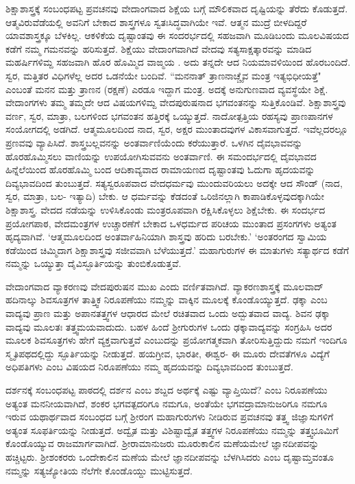 ಶಿಕ್ಷಾಶಾಸ್ತ್ರಕ್ಕೆ  ಸಂಬಂಧಪಟ್ಟ ಪ್ರವಚನವು ವೇದಾಂಗವಾದ ಶಿಕ್ಷೆಯ ಬಗ್ಗೆ ಮೌಲಿಕವಾದ ದೃಷ್ಟಿಯನ್ನು ತೆರೆದು ಕೊಡುತ್ತದೆ. ಆತ್ಮವಿರುವೆಡೆಯಲ್ಲಿ ಅವನಿಗೆ ಬೇಕಾದ ಶಾಸ್ತ್ರಗಳೂ ಸ್ವತಃಸಿದ್ಧವಾಗಿಯೇ ಇವೆ. ಆತ್ಮನ ಮುದ್ರೆ ಬೀಳದಿದ್ದರೆ ಯಾವಶಾಸ್ತ್ರಕ್ಕೂ ಬೆಳಕಿಲ್ಲ. ಆಕಳಿಕೆಯ ದೃಷ್ಟಾಂತವು ಈ ಸಂದರರ್ಭದಲ್ಲಿ ಸಹಜವಾಗಿ ಮೂಡಿಬಂದು ಮೂಲವಿಷಯದ ಕಡೆಗೆ ನಮ್ಮ ಗಮನವನ್ನು ಹರಿಸುತ್ತದೆ. ಶಿಕ್ಷೆಯು ವೇದಾಂಗವಾಗಿದೆ ವೇದವು ಸತ್ಯಸಾಕ್ಷತ್ಕಾರವನ್ನು ಮಾಡಿದ ಮಹರ್ಷಿಗಳಿಮ್ದ ಸಹಜವಾಗಿ ಹೊರ ಹೊಮ್ಮಿದ ವಾಙ್ಮಯ . ಅದು ತನ್ನದೇ ಆದ ನಿಯಮಾವಳಿಯಿಂದ ಹೊರಬಂದಿದೆ. ಸ್ವರ, ಮತ್ತಿತರ ವಿಧಿಗಳೆಲ್ಲ ಅದರ ಒಡನೆಯೇ ಬಂದಿವೆ. ``ಮನನಾತ್ ತ್ರಾಣನಾಚ್ಚೈವ ಮಂತ್ರ ಇತ್ಯಭಿಧೀಯತ್ತೆ" ಎಂಬಂತೆ ಮನನ ಮತ್ತು ತ್ರಾಣನ (ರಕ್ಷಣೆ) ಎರಡೂ ಇದ್ದಾಗ ಮಂತ್ರ. ಅದಕ್ಕೆ ಅನುಗುಣವಾದ ವ್ಯವಸ್ಥೆಯೇ ಶಿಕ್ಷೆ. ವೇದಾಂಗಗಳು ತಮ್ಮ  ತಮ್ಮದೇ ಆದ ವಿಷಯಗಳಿಮ್ದ ವೇದಪುರುಷನಾದ ಭಗವಂತನನ್ನು ಸುತ್ತಿಕೊಂಡಿವೆ. ಶಿಕ್ಷಾಶಾಸ್ತ್ರವು ವರ್ಣ, ಸ್ವರ, ಮಾತ್ರಾ, ಬಲಗಳಿಂದ ಭಗವಂತನ ಹತ್ತಿರಕ್ಕೆ ಒಯ್ಯುತ್ತದೆ. ನಾದೋತ್ಪತ್ತಿಯ ರಹಸ್ಯವು ಪ್ರಾಣಪಾನಗಳ ಸಂಯೋಗದಲ್ಲಿ ಅಡಗಿದೆ. ಆತ್ಮಮೂಲದಿಂದ ನಾದ, ಸ್ವರ, ಅಕ್ಷರ ಮುಂತಾದವುಗಳ ವಿಕಾಸವಾಗುತ್ತದೆ. ಇವೆಲ್ಲದರಲ್ಲೂ ಪ್ರಣವವು ವ್ಯಾಪಿಸಿದೆ. ಶಾಸ್ತ್ರಬಲ್ಲವನನ್ನು ಅಂತರ್ವಾಣಿಯೆಂದು ಕರೆಯುತ್ತಾರೆ. ಒಳಗಿನ ದೈವಭಾವವನ್ನು ಹೊರಹೊಮ್ಮಿಸಲು ವಾಣಿಯನ್ನು ಉಪಯೋಗಿಸುವವನು ಅಂತರ್ವಾಣಿ. ಈ ಸಮಂದರ್ಭದಲ್ಲಿ ದೈವಭಾವದ ಹಿನ್ನೆಲೆಯಿಂದ ಹೊರಹೊಮ್ಮಿ ಬಂದ ಆದಿಕಾವ್ಯವಾದ ರಾಮಾಯಣದ ದೃಷ್ಟಾಂತವು ಓದುಗಾ ಹೃದಯವನ್ನು ದಿವ್ಯಭಾವದಿಂದ ತುಂಬುತ್ತದೆ. ಸತ್ಯಸ್ವರೂಪವಾದ ವೇದಧರ್ಮವು ಮುಂದುವರಿಯಲು ಅದಕ್ಕೇ ಆದ ಸೌಂಡ್ (ನಾದ, ಸ್ವರ, ಮಾತ್ರಾ, ಬಲ- ಇತ್ಯಾದಿ) ಬೇಕು. ಆ ಧರ್ಮವನ್ನು ಕೆಡದಂತೆ ಒರಿಜಿನಲ್ಲಾಗಿ ಕಾಪಾಡಿಕೊಳ್ಳವುದಕ್ಕಾಗಿಯೇ ಶಿಕ್ಷಾಶಾಸ್ತ್ರ. ವೇದದ ನಡೆಯನ್ನು ಉಳಿಸಿಕೊಂಡು ಮಂತ್ರರೂಪವಾಗಿ ರಕ್ಷಿಸಿಕೊಳ್ಳಲು ಶಿಕ್ಷೆಬೇಕು. ಈ ಸಂದರ್ಭದ ಪ್ರಯೋಗಪಾಠ, ವೇದಮಂತ್ರಗಳ ಉಚ್ಚಾರಣೆಗೆ ಬೇಕಾದ ಒಳಧರ್ಮದ ಪರಿಚಯ ಮುಂತಾದ ಪ್ರಸಂಗಗಳು ಅತ್ಯಂತ ಹೃದ್ಯವಾಗಿವೆ. `ಆತ್ಮಮೂಲದಿಂದ ಅಂತರ್ವಾಹಿನಿಯಾಗಿ ಶಾಸ್ತ್ರವು ಹರಿದು ಬರಬೇಕು.' `ಅಂತರಂಗದ ಸ್ವಾಮಿಯ ಕಡೆಯಿಂದ ಚಿಮ್ಮಿದಾಗ ಶಿಕ್ಷಾಶಾಸ್ತ್ರವು ಸಜೀವವಾಗಿ ಬೆಳೆಯುತ್ತದೆ.' ಮಹಾಗುರುಗಳ ಈ ಮಾತುಗಳು ಸತ್ಯಾರ್ಥದ ಕಡೆಗೆ ನಮ್ಮನ್ನು ಒಯ್ಯುತ್ತಾ ದೈವಿಸ್ಛೂರ್ತಿಯನ್ನು ತುಂಬಿಕೊಡುತ್ತವೆ.

ವೇದಾಂಗವಾದ ವ್ಯಾಕರಣವು ವೇದಪುರುಷನ ಮುಖ ಎಂದು ವರ್ಣಿತವಾಗಿದೆ. ವ್ಯಾಕರಣಶಾಸ್ತ್ರಕ್ಕೆ ಮೂಲವಾದ್ ಹದಿನಾಲ್ಕು ಶಿವಸೂತ್ರಗಳ ತಾತ್ತ್ವಿಕ ನಿರೂಪಣೆಯು ನಮ್ಮನ್ನು ವಾಕ್ಕಿನ ಮೂಲಕ್ಕೆ ಕೊಂಡೊಯ್ಯುತ್ತದೆ. ಢಕ್ಕಾ ಎಂಬ ವಾದ್ಯವು ಪ್ರಾಣ ಮತ್ತು ಅಪಾನತತ್ತ್ವಗಳ ಆಧಾರದ ಮೇಲೆ ರಚಿತವಾದ ಒಂದು ಅದ್ಬುತವಾದ ವಾದ್ಯ. ಶಿವನ ಢಕ್ಕಾ ವಾದ್ಯವು ಮೂಲತಃ ತತ್ತ್ವಮಯವಾದುದು. ಬಹಳ ಹಿಂದೆ ಶ್ರೀಗುರುಗಳ ಒಂದು ಢಕ್ಕಾವಾದ್ಯವನ್ನು ಸಂಗ್ರಹಿಸಿ ಅದರ ಮೂಲಕ ಶಿವಸೂತ್ರಗಳು ಹೇಗೆ ವ್ಯಕ್ತವಾಗುತ್ತವೆ ಎಂಬುದನ್ನು ಪ್ರಯೋಗತ್ಮಕವಾಗಿ ತೋರಿಸುತ್ತಿದ್ದುದು ನಮಗೆ  ಇಂದಿಗೂ ಸ್ಮೃತಿಪಥದಲ್ಲಿದ್ದು ಸ್ಫೂರ್ತಿಯನ್ನು ನೀಡುತ್ತದೆ. ಹಯಗ್ರೀವ, ಭಾರತೀ, ಈಶ್ವರ- ಈ ಮೂರು ದೇವತೆಗಳೂ ವಿದ್ಯೆಗೆ ಅಧಿಪತಿಗಳು ಎಂಬ ವಿಷಯದ ನಿರೂಪಣೆಯು ನಮ್ಮ ಹೃದಯವನ್ನು ದಿವ್ಯಭಾವದಿಂದ ತುಂಬುತ್ತದೆ.

ದರ್ಶನಕ್ಕೆ  ಸಂಬಂಧಪಟ್ಟ ಪಾಠದಲ್ಲಿ ದರ್ಶನ ಎಂಬ ಶಬ್ದದ ಅರ್ಥಕ್ಕೆ ಎಷ್ಟು ವ್ಯಾಪ್ತಿಯಿದೆ? ಎಂಬ ನಿರೂಪಣೆಯು ಅತ್ಯಂತ ಮನನೀಯವಾಗಿದೆ, ಶಂಕರ ಭಗವತ್ಪದರಿಗೂ ನಮಗೂ, ಅಂತೆಯೇ ಭಗವದ್ರಾಮಾನುಜರಿಗೂ ನಮಗೂ ಇರುವ ಯಥಾರ್ಥವಾದ ಸಂಬಂಧದ ಬಗ್ಗೆ ಶ್ರೀರಂಗ ಮಹಾಗುರುಗಳು ನೀಡಿರುವ ಪ್ರವಚನವು ತತ್ತ್ವ ಜಿಜ್ಞಾಸುಗಳಿಗೆ ಅತ್ಯಂತ ಸೂಫರ್ತಿಯನ್ನು ನೀಡುತ್ತದೆ. ಅದ್ವೈತ ಮತ್ತು ವಿಶಿಷ್ಟಾದ್ವೈತ ತತ್ತ್ವಗಳ ನಿರೂಪಣೆಯು ನಮ್ಮನ್ನು ತತ್ತ್ವಭೂಮಿಗೆ ಕೊಂಡೊಯ್ಯುವ ರಾಜಮಾರ್ಗವಾಗಿದೆ. ಶ್ರೀರಾಮಾನುಜರು ಮೂರುಕಾಲಿನ ಮಣೆಯಮೇಲೆ ಜ್ಞಾನದೀಪವನ್ನು ಹಚ್ಚಿಟ್ಟರು. ಶ್ರೀಶಂಕರರು ಒಂದೇಕಾಲಿನ ಮಣೆಯ ಮೇಲೆ ಜ್ಞಾನದೀಪವನ್ನು ಬೆಳಗಿಸಿದರು ಎಂಬ ದೃಷ್ಟಾಮ್ತವಂತೂ ನಮ್ಮನ್ನು ಸತ್ಯಜ್ಯೋತಿಯ ನೆಲೆಗೇ ಕೊಂಡೊಯ್ದು ಮುಟ್ಟಿಸುತ್ತದೆ.

